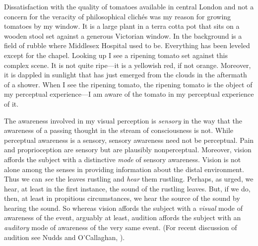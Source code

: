 \documentclass[12pt]{article}
\begin{document}
Dissatisfaction with the quality of tomatoes available in central London and not a concern for the veracity of philosophical clichés was my reason for growing tomatoes by my window. It is a large plant in a terra cotta pot that sits on a wooden stool set against a generous Victorian window. In the background is a field of rubble where Middlesex Hospital used to be. Everything has been leveled except for the chapel. Looking up I see a ripening tomato set against this complex scene. It is not quite ripe---it is a yellowish red, if not orange. Moreover, it is dappled in sunlight that has just emerged from the clouds in the aftermath of a shower. When I see the ripening tomato, the ripening tomato is the object of my perceptual experience---I am aware of the tomato in my perceptual experience of it. 

The awareness involved in my visual perception is \emph{sensory} in the way that the awareness of a passing thought in the stream of consciousness is not. While perceptual awareness is a sensory, sensory awareness need not be perceptual. Pain and proprioception are sensory but are plausibly nonperceptual. Moreover, vision affords the subject with a distinctive \emph{mode} of sensory awareness. Vision is not alone among the senses in providing information about the distal environment. Thus we can \emph{see} the leaves rustling and \emph{hear} them rustling. Perhaps, as \citet[]{Berkeley:1734fk} urged, we hear, at least in the first instance, the sound of the rustling leaves. But, if we do, then, at least in propitious circumstances, we hear the source of the sound by hearing the sound. So whereas vision affords the subject with a \emph{visual} mode of awareness of the event, arguably at least, audition affords the subject with an \emph{auditory} mode of awareness of the very same event. (For recent discussion of audition see Nudds and O'Callaghan, \citeyear{Nudds:2009sk}).
\end{document}
